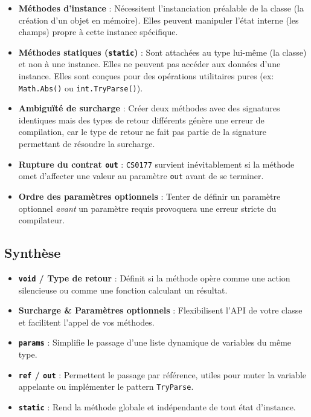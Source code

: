 \begin{itemize}
    \item \textbf{Méthodes d'instance} : Nécessitent l'instanciation préalable de la classe (la création d'un objet en mémoire). Elles peuvent manipuler l'état interne (les champs) propre à cette instance spécifique.
    \item \textbf{Méthodes statiques (\texttt{static})} : Sont attachées au type lui-même (la classe) et non à une instance. Elles ne peuvent pas accéder aux données d'une instance. Elles sont conçues pour des opérations utilitaires pures (ex: \texttt{Math.Abs()} ou \texttt{int.TryParse()}).
\end{itemize}

\begin{tcolorbox}[colback=backcolour,colframe=keywordcolor,title=\textbf{Pièges Courants \& Erreurs}]
\begin{itemize}
    \item \textbf{Ambiguïté de surcharge} : Créer deux méthodes avec des signatures identiques mais des types de retour différents génère une erreur de compilation, car le type de retour ne fait pas partie de la signature permettant de résoudre la surcharge.
    \item \textbf{Rupture du contrat \texttt{out}} : \texttt{CS0177} survient inévitablement si la méthode omet d'affecter une valeur au paramètre \texttt{out} avant de se terminer.
    \item \textbf{Ordre des paramètres optionnels} : Tenter de définir un paramètre optionnel \textit{avant} un paramètre requis provoquera une erreur stricte du compilateur.
\end{itemize}
\end{tcolorbox}

\subsection{Synthèse}
\begin{itemize}
    \item \textbf{\texttt{void} / Type de retour} : Définit si la méthode opère comme une action silencieuse ou comme une fonction calculant un résultat.
    \item \textbf{Surcharge \& Paramètres optionnels} : Flexibilisent l'API de votre classe et facilitent l'appel de vos méthodes.
    \item \textbf{\texttt{params}} : Simplifie le passage d'une liste dynamique de variables du même type.
    \item \textbf{\texttt{ref} / \texttt{out}} : Permettent le passage par référence, utiles pour muter la variable appelante ou implémenter le pattern \texttt{TryParse}.
    \item \textbf{\texttt{static}} : Rend la méthode globale et indépendante de tout état d'instance.
\end{itemize}
